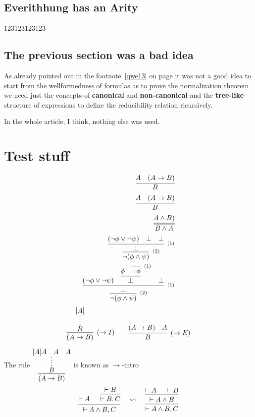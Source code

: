 \documentclass[11pt,a5paper,draft,oneside]{amsbook}
\newcommand{\femph}{\textbf}
\begin{document}
	\section{Everithhung has an Arity} 
		123123123123
	\section{The previous section was a bad idea}
		As already pointed out in the footnote~\ref{qwe13} on page \pageref{qwe13} it was not a good idea to start from the wellformedness of formulas as to prove the normalization theorem we need just the concepts of \femph{canonical} 
		and \femph{non-canonical} and the \femph{tree-like} structure of expressions to define the reducibility relation ricursively.
		
		In the whole article, I think, nothing else was used.
\chapter{Test stuff}
	\begin{eqnarray}
		\infer{B}{A & (A \rightarrow B)}	\\
		\infer{B}{A & (A \rightarrow B)}	\\
		\infer={B \land A}{A \land B)}		\\
		\infer[^{(2)}]
     {\neg(\phi \land \psi)}
     {\infer[^{(1)}]
        {\bot}
        {(\neg\phi \lor \neg\psi) & \bot & \bot}
     }
     \\
     \infer[^{(2)}]
     {\neg(\phi \land \psi)}
     {\infer[^{(1)}]
        {\bot}
        {(\neg\phi \lor \neg\psi) & 
        \infer
            {\bot}
            {\phi & 
            \infer[^{(1)}]
            {\neg\phi}{}
            } 
        & \bot}
     }\\     
	\end{eqnarray}
$$
\infer[(\to I)]
     {(A \to B)}
     {
     \infer*{B}{[A]}
     }
\qquad
\infer[(\to E)]
     {B}
     {(A \to B) & A}
$$



The rule 
$\vcenter
{
\infer
    {(A \to B)}
    {
    \infer*{B}{[A] A & A & A}
    }
}$
is known as $\to$-intro
\newpage
\[
\begin{prooftree}
\Hypo{ \vdash A }
\Hypo{ \vdash B } \Infer1{ \vdash B, C }
\Infer2{ \vdash A\wedge B, C }
\end{prooftree}
%
\quad \rightsquigarrow \quad
\begin{prooftree}
\Hypo{ \vdash A } \Hypo{ \vdash B }
\Infer2{ \vdash A\wedge B }
\Infer1{ \vdash A\wedge B, C }
\end{prooftree}
\]
\end{document}
